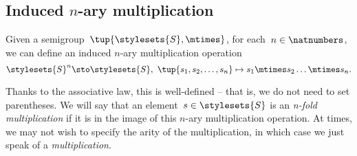 \subsection{Induced $n$-ary multiplication}
Given a semigroup~$\tup{\stylesets{S}, \mtimes}$, for each~$n \in \natnumbers$, we can define an induced $n$-ary multiplication operation
\begin{equation*}
    \stylesets{S}^n \sto \stylesets{S}, \ \tup{s_1, s_2, \dots, s_n} \mapsto s_1 \mtimes s_2 \dots \mtimes s_n.
\end{equation*}



Thanks to the associative law, this is well-defined -- that is, we do not need to set parentheses.
We will say that an element~$s \in \stylesets{S}$ is an \emph{n-fold multiplication} if it is in the image of this $n$-ary multiplication operation.
At times, we may not wish to specify the arity of the multiplication, in which case we just speak of a \emph{multiplication}.

\showslides{\begin{forslides}
                \begin{equation}
                    \label{eq:sg-mora}
                    \mora
                \end{equation}
                \begin{equation}
                    \label{eq:sg-morb}
                    \morb
                \end{equation}
                \begin{equation}
                    \label{eq:sg-morab}
                    \mora\then\morb
                \end{equation}
\end{forslides}
}
